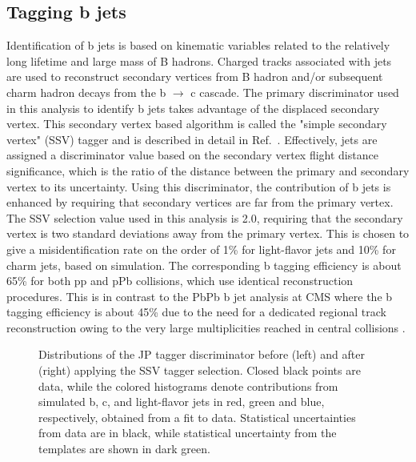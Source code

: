 \subsection{Tagging b jets}
Identification of b jets is based on kinematic variables related to the relatively long lifetime and large mass of B hadrons. Charged tracks associated with jets are used to reconstruct secondary vertices from B hadron and/or subsequent charm hadron decays from the b $\rightarrow$ c cascade. The primary discriminator used in this analysis to identify b jets takes advantage of the displaced secondary vertex. This secondary vertex based algorithm is called the "simple secondary vertex" (SSV) tagger and is described in detail in Ref.~\cite{Chatrchyan:2012jua}.  Effectively, jets are assigned a discriminator value based on the secondary vertex flight distance significance, which is the ratio of the distance between the primary and secondary vertex to its uncertainty.  Using this discriminator, the contribution of b jets is enhanced by requiring that secondary vertices are far from the primary vertex. The SSV selection value used in this analysis is 2.0, requiring that the secondary vertex is two standard deviations away from the primary vertex.  This is chosen to give a misidentification rate on the order of 1\% for light-flavor jets and 10\% for charm jets, based on simulation. The corresponding b tagging efficiency is about 65\% for both pp and pPb collisions, which use identical reconstruction procedures.  This is in contrast to the PbPb b jet analysis at CMS where the b tagging efficiency is about 45\% due to the need for a dedicated regional track reconstruction owing to the very large multiplicities reached in central collisions \cite{HIN-12-003}.

\begin{figure}[htb]
\begin{center}
\caption{\label{fig:JPdistr}
Distributions of the JP tagger discriminator before (left) and after (right) applying the SSV tagger selection. Closed black points are data, while the colored histograms denote contributions from simulated b, c, and light-flavor jets in red, green and blue, respectively, obtained from a fit to data. Statistical uncertainties from data are in black, while statistical uncertainty from the templates are shown in dark green.
}
\end{center}
\end{figure}

